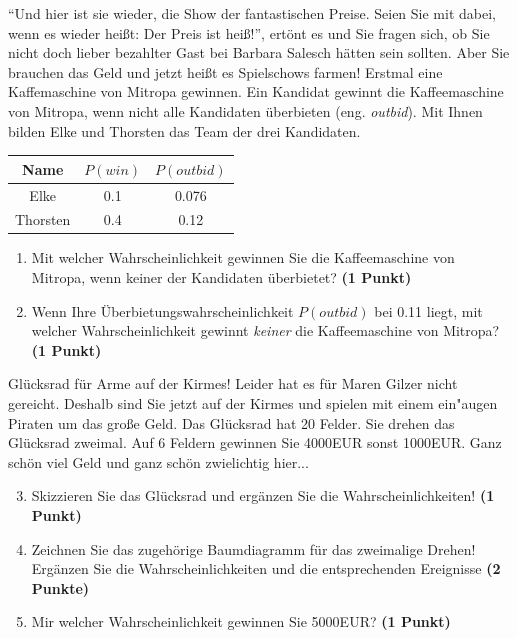 \documentclass[a4paper, 9pt]{scrartcl}\usepackage[]{graphicx}\usepackage[]{xcolor}
\begin{document}
"`Und hier ist sie wieder, die Show der fantastischen Preise. Seien Sie mit
dabei, wenn es wieder hei{\ss}t: Der Preis ist hei{\ss}!"', ert{\"o}nt es und Sie
fragen sich, ob Sie nicht doch lieber bezahlter Gast bei Barbara Salesch
h{\"a}tten sein sollten. Aber Sie brauchen das Geld und jetzt hei{\ss}t es
Spielschows farmen! Erstmal eine Kaffemaschine von Mitropa
gewinnen. Ein Kandidat gewinnt die Kaffeemaschine von Mitropa, wenn nicht alle
Kandidaten {\"u}berbieten (eng. \textit{outbid}). Mit Ihnen bilden
Elke und Thorsten das Team der drei Kandidaten.

\begin{center}
\begin{tabular}{ccc}
  \toprule
  Name & $P(win)$ & $P(outbid)$\\
  \midrule
  Elke & 0.1 & 0.076\\
  Thorsten & 0.4 & 0.12 \\
  \bottomrule
\end{tabular}
\end{center}

\begin{enumerate}
\item Mit welcher Wahrscheinlichkeit gewinnen Sie die Kaffeemaschine von
  Mitropa, wenn keiner der Kandidaten {\"u}berbietet? \textbf{(1 Punkt)}
\item Wenn Ihre {\"U}berbietungswahrscheinlichkeit $P(outbid)$ bei
  0.11 liegt, mit welcher Wahrscheinlichkeit gewinnt
  \textit{keiner} die Kaffeemaschine von Mitropa? \textbf{(1 Punkt)}
\end{enumerate}

Gl{\"u}cksrad f{\"u}r Arme auf der Kirmes! Leider hat es f{\"u}r Maren Gilzer nicht
gereicht. Deshalb sind Sie jetzt auf der Kirmes und spielen mit
einem ein{"a}ugen Piraten um das gro{\ss}e Geld. Das Gl{\"u}cksrad hat 20
Felder. Sie drehen das Gl{\"u}cksrad zweimal. Auf 6 Feldern
gewinnen Sie 4000EUR sonst 1000EUR. Ganz sch{\"o}n viel Geld
und ganz sch{\"o}n zwielichtig hier...

\begin{enumerate}
  \setcounter{enumi}{2}  
\item Skizzieren Sie das Gl{\"u}cksrad und erg{\"a}nzen Sie die
  Wahrscheinlichkeiten! \textbf{(1 Punkt)}
\item Zeichnen Sie das zugeh{\"o}rige Baumdiagramm f{\"u}r das zweimalige Drehen!
  Erg{\"a}nzen Sie die Wahrscheinlichkeiten und die entsprechenden Ereignisse
  \textbf{(2 Punkte)}
\item Mir welcher Wahrscheinlichkeit gewinnen Sie 5000EUR? \textbf{(1
    Punkt)}
\end{enumerate}
\end{document}
